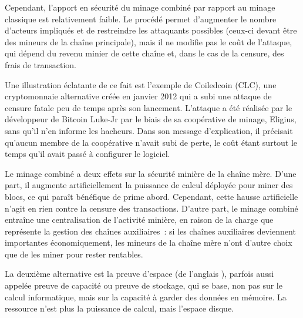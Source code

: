 Cependant, l'apport en sécurité du minage combiné par rapport au minage classique est relativement faible. Le procédé permet d'augmenter le nombre d'acteurs impliqués et de restreindre les attaquants possibles (ceux-ci devant être des mineurs de la chaîne principale), mais il ne modifie pas le coût de l'attaque, qui dépend du revenu minier de cette chaîne et, dans le cas de la censure, des frais de transaction.

Une illustration éclatante de ce fait est l'exemple de Coiledcoin (CLC), une cryptomonnaie alternative créée en janvier 2012 qui a subi une attaque de censure fatale peu de temps après son lancement. L'attaque a été réalisée par le développeur de Bitcoin Luke-Jr par le biais de sa coopérative de minage, Eligius, sans qu'il n'en informe les hacheurs. Dans son message d'explication, il précisait qu'aucun membre de la coopérative n'avait subi de perte, le coût étant surtout le temps qu'il avait passé à configurer le logiciel.

Le minage combiné a deux effets sur la sécurité minière de la chaîne mère. D'une part, il augmente artificiellement la puissance de calcul déployée pour miner des blocs, ce qui paraît bénéfique de prime abord. Cependant, cette hausse artificielle n'agit en rien contre la censure des transactions. D'autre part, le minage combiné entraîne une centralisation de l'activité minière, en raison de la charge que représente la gestion des chaînes auxiliaires~: si les chaînes auxiliaires deviennent importantes économiquement, les mineurs de la chaîne mère n'ont d'autre choix que de les miner pour rester rentables.



La deuxième alternative est la preuve d'espace (de l'anglais ), parfois aussi appelée preuve de capacité ou preuve de stockage, qui se base, non pas sur le calcul informatique, mais sur la capacité à garder des données en mémoire. La ressource n'est plus la puissance de calcul, mais l'espace disque.

